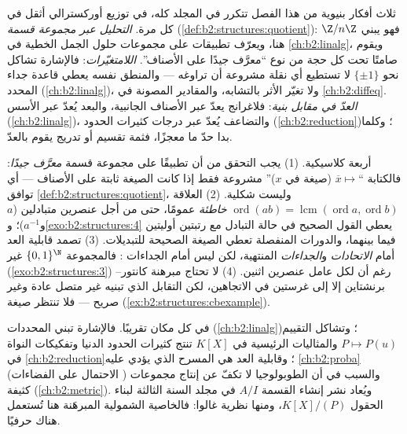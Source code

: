 \begin{remark}\label{rem:b2:structures:perspectives}
ثلاث أفكار بنيوية من هذا الفصل تتكرر في المجلد كله، في توزيع
أوركسترالي أثقل في كل مرة. \emph{التحليل عبر مجموعة قسمة}
(\cref{def:b2:structures:quotient}): فهو يبني $\Z/n\Z$ هنا،
ويعرّف تطبيقات على مجموعات حلول الجمل الخطية في
\cref{ch:b2:linalg}، ويقوم صامتًا تحت كل حجة من نوع
``معرَّف جيدًا على الأصناف''. \emph{اللامتغيّرات}: فالإشارة
تشاكل نحو $\{\pm1\}$ لا تستطيع أي نقلة مشروعة أن تراوغه ---
والمنطق نفسه يعطي قاعدة جداء المحدد
(\cref{ch:b2:linalg})، ولا تغيّر الأثر بالتشابه،
والمقادير المصونة في \cref{ch:b2:diffeq}.
\emph{العدّ في مقابل بنية}: فلاغرانج يعدّ عبر الأصناف
الجانبية، والبعد يُعدّ عبر الأسس
(\cref{ch:b2:linalg})، والتضاعف يُعدّ عبر درجات
كثيرات الحدود (\cref{ch:b2:reduction})؛ وكلما بدا حدّ ما
معجزًا، فثمة تقسيم أو تدريج يقوم بالعدّ.
\end{remark}

\begin{remark}\label{rem:b2:structures:pitfalls}
أربعة كلاسيكية. (1) يجب التحقق من أن تطبيقًا على مجموعة قسمة
\emph{معرَّف جيدًا}: فالكتابة ``$\overline x \mapsto$ (صيغة في $x$)''
مشروعة فقط إذا كانت الصيغة ثابتة على الأصناف ---
أي توافق \cref{def:b2:structures:quotient}، وليست شكلية.
(2) العلاقة $\operatorname{ord}(ab) =
\operatorname{lcm}(\operatorname{ord}a, \operatorname{ord}b)$
\emph{خاطئة} عمومًا، حتى من أجل عنصرين متبادلين ($a$
و$a^{-1}$)؛ و\cref{exo:b2:structures:4} يعطي القول الصحيح
في حالة التبادل مع رتبتين أوليتين فيما بينهما، والدورات المنفصلة
تعطي الصيغة الصحيحة للتبديلات. (3) تصمد قابلية العد أمام
\emph{الاتحادات}  و\emph{الجداءات} المنتهية، لكن ليس
أمام الجداءات : فالمجموعة $\{0,1\}^{\N}$ غير 
(\cref{exo:b2:structures:3}) رغم أن لكل عامل عنصرين
اثنين. (4) لا تحتاج مبرهنة كانتور--برنشتاين إلا إلى غرستين في
الاتجاهين، لكن التقابل الذي تبنيه غير متصل عادة وغير صريح ---
فلا تنتظر صيغة
(\cref{ex:b2:structures:cbexample}).
\end{remark}

\begin{remark}
في كل مكان تقريبًا. فالإشارة تبني المحددات
(\cref{ch:b2:linalg})؛ وتشاكل التقييم $P \mapsto P(u)$
والمثاليات الرئيسية في $K[X]$ تنتج كثيرات الحدود الدنيا
وتفكيكات النواة في \cref{ch:b2:reduction}؛ وقابلية العد
هي المسرح الذي يؤدي عليه \cref{ch:b2:proba} (الاحتمال على الفضاءات
) والسبب في أن الطوبولوجيا لا تكفّ عن إنتاج مجموعات
كثيفة  (\cref{ch:b2:metric}). ويُعاد نشر إنشاء القسمة $A/I$
في مجلد السنة الثالثة لبناء الحقول $K[X]/(P)$، ومنها نظرية غالوا:
فالخاصية الشمولية المبرهَنة هنا تُستعمل هناك حرفيًا.
\end{remark}

